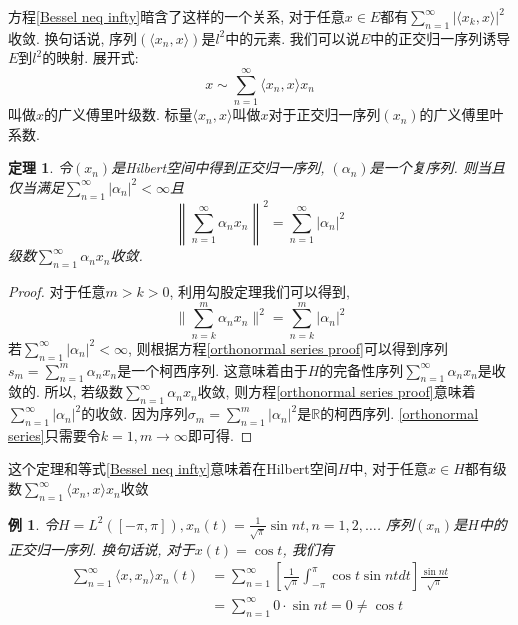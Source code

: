 \documentclass[a4paper,11pt]{book}
\newtheorem{theorem}{\hspace{2em}定理}[section]
\newtheorem{proof}{证明}[section]
\newtheorem{example}{例}[section]
\begin{document}
\indent 方程\ref{Bessel neq infty}暗含了这样的一个关系, 对于任意$x\in E$都有$\sum_{n=1}^{\infty}|\langle x_k,x\rangle|^2$收敛. 换句话说, 序列$(\langle x_n,x\rangle)$是$l^2$中的元素. 我们可以说$E$中的正交归一序列诱导$E$到$l^2$的映射. 展开式:
\begin{equation}\label{expansion}
  x\sim\sum_{n=1}^{\infty}\langle x_n,x\rangle x_n
\end{equation}
叫做$x$的广义傅里叶级数. 标量$\langle x_n,x\rangle$叫做$x$对于正交归一序列$(x_n)$的广义傅里叶系数.
\begin{theorem}\label{norm in orthonormal}
  令$(x_n)$是Hilbert空间中得到正交归一序列, $(\alpha_n)$是一个复序列. 则当且仅当满足$\sum_{n=1}^{\infty}|\alpha_n|^2<\infty$且
  \begin{equation}\label{orthonormal series}
    \left\|\sum_{n=1}^{\infty}\alpha_n x_n\right\|^2=\sum_{n=1}^{\infty}|\alpha_n|^2
  \end{equation}
级数$\sum_{n=1}^{\infty}\alpha_n x_n$收敛.
\end{theorem}
\begin{proof}
  对于任意$m>k>0$, 利用勾股定理我们可以得到,
  \begin{equation}\label{orthonormal series proof}
    \|\sum_{n=k}^{m}\alpha_n x_n\|^2=\sum_{n=k}^{m}|\alpha_n|^2
  \end{equation}
  若$\sum_{n=1}^{\infty}|\alpha_n|^2<\infty$, 则根据方程\eqref{orthonormal series proof}可以得到序列$s_m=\sum_{n=1}^{m}\alpha_n x_n$是一个柯西序列. 这意味着由于$H$的完备性序列$\sum_{n=1}^{\infty}\alpha_n x_n$是收敛的.
  \indent 所以, 若级数$\sum_{n=1}^{\infty}\alpha_n x_n$收敛, 则方程\eqref{orthonormal series proof}意味着$\sum_{n=1}^{\infty}|\alpha_n|^2$的收敛. 因为序列$\sigma_m=\sum_{n=1}^{m}|\alpha_n|^2$是$\mathbb{R}$的柯西序列.
  \eqref{orthonormal series}只需要令$k=1,m\to\infty$即可得.
\end{proof}
这个定理和等式\eqref{Bessel neq infty}意味着在Hilbert空间$H$中, 对于任意$x\in H$都有级数$\sum_{n=1}^{\infty}\langle x_n,x\rangle x_n$收敛
\begin{example}
  令$H=L^2([-\pi,\pi]),x_n(t)=\frac{1}{\sqrt{\pi}}\sin nt,n=1,2,\dots$. 序列$(x_n)$是$H$中的正交归一序列. 换句话说, 对于$x(t)=\cos t$, 我们有
  \begin{equation*}
  \begin{split}
     \sum_{n=1}^{\infty}\langle x,x_n\rangle x_n(t)&=\sum_{n=1}^{\infty}\left[\frac{1}{\sqrt{\pi}}\int_{-\pi}^{\pi}\cos t\sin ntdt\right]\frac{\sin nt}{\sqrt{\pi}} \\
       &=\sum_{n=1}^{\infty}0\cdot \sin nt=0\neq\cos t
  \end{split}
  \end{equation*}
\end{example}
\end{document}
